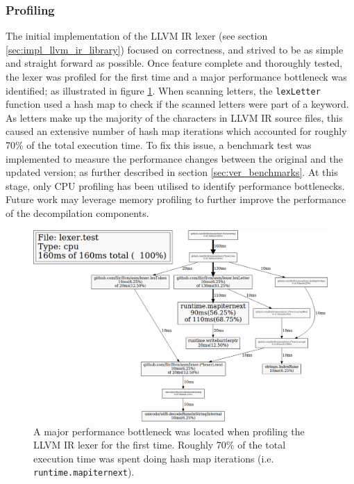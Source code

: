 
\subsubsection{Profiling}
\label{sec:ver_profiling}

The initial implementation of the LLVM IR lexer (see section \ref{sec:impl_llvm_ir_library}) focused on correctness, and strived to be as simple and straight forward as possible. Once feature complete and thoroughly tested, the lexer was profiled for the first time and a major performance bottleneck was identified; as illustrated in figure \ref{fig:lexer_pprof}. When scanning letters, the \texttt{lexLetter} function used a hash map to check if the scanned letters were part of a keyword. As letters make up the majority of the characters in LLVM IR source files, this caused an extensive number of hash map iterations which accounted for roughly 70\% of the total execution time. To fix this issue, a benchmark test was implemented to measure the performance changes between the original and the updated version; as further described in section \ref{sec:ver_benchmarks}. At this stage, only CPU profiling has been utilised to identify performance bottlenecks. Future work may leverage memory profiling to further improve the performance of the decompilation components.

\begin{figure}[htbp]
	\begin{center}
		\includegraphics[width=\textwidth]{inc/8_ver/lexer_pprof.png}
		\caption{A major performance bottleneck was located when profiling the LLVM IR lexer for the first time. Roughly 70\% of the total execution time was spent doing hash map iterations (i.e. \texttt{runtime.mapiternext}).}
		\label{fig:lexer_pprof}
	\end{center}
\end{figure}
